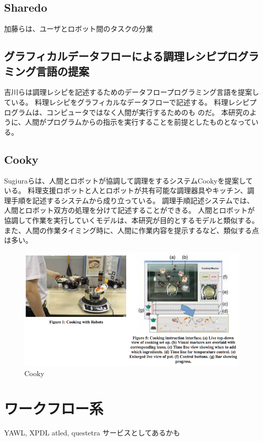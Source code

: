 \subsection{Sharedo}\label{sharedo}

加藤らは、ユーザとロボット間のタスクの分業

\cite{sharedo}

\subsection{グラフィカルデータフローによる調理レシピプログラミング言語の提案}\label{ux30b0ux30e9ux30d5ux30a3ux30abux30ebux30c7ux30fcux30bfux30d5ux30edux30fcux306bux3088ux308bux8abfux7406ux30ecux30b7ux30d4ux30d7ux30edux30b0ux30e9ux30dfux30f3ux30b0ux8a00ux8a9eux306eux63d0ux6848}

吉川らは調理レシピを記述するためのデータフロープログラミング言語を提案している\cite{recipe-programming}。
料理レシピをグラフィカルなデータフローで記述する。
料理レシピプログラムは、コンピュータではなく人間が実行するためのも
のだ。
本研究のように、人間がプログラムからの指示を実行することを前提としたものとなっている。

\subsection{Cooky}\label{cooky}

Sugiuraらは、人間とロボットが協調して調理をするシステムCooky\cite{cooky}を提案している。
料理支援ロボットと人とロボットが共有可能な調理器具やキッチン、調理手順を記述するシステムから成り立っている。
調理手順記述システムでは、人間とロボット双方の処理を分けて記述することができる。
人間とロボットが協調して作業を実行していくモデルは、本研究が目的とするモデルと類似する。
また、人間の作業タイミング時に、人間に作業内容を提示するなど、類似する点は多い。

\begin{figure}[htbp]
  \begin{center}
  \includegraphics[width=.6\linewidth,bb=0 0 633 336]{images/cooky.png}
  \end{center}
  \caption{Cooky}
  \label{fig:cooky}
\end{figure}

\section{ワークフロー系}\label{ux30efux30fcux30afux30d5ux30edux30fcux7cfb}

YAWL, XPDL atled, questetra サービスとしてあるかも
